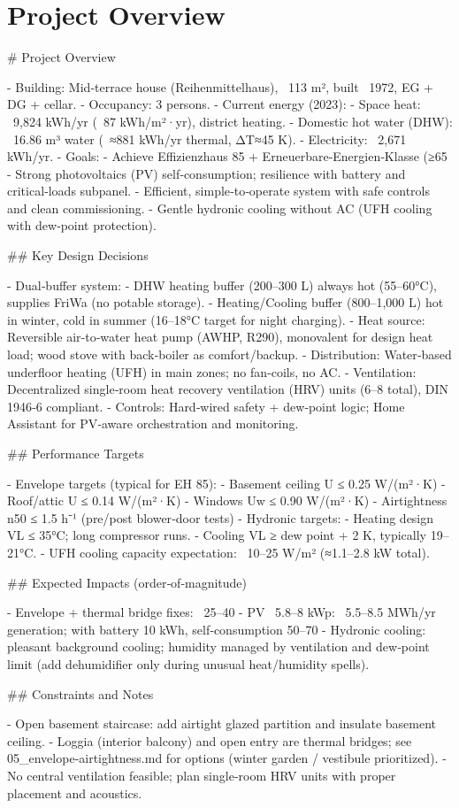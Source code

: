 \documentclass[11pt,oneside]{report}
\begin{document}
\chapter{Project Overview}
\begin{markdown}
# Project Overview

- Building: Mid‑terrace house (Reihenmittelhaus), ~113 m², built ~1972, EG + DG + cellar.
- Occupancy: 3 persons.
- Current energy (2023):
  - Space heat: ~9,824 kWh/yr (~87 kWh/m²·yr), district heating.
- Domestic hot water (DHW): ~16.86 m³ water (~≈881 kWh/yr thermal, ΔT≈45 K).
  - Electricity: ~2,671 kWh/yr.
- Goals:
  - Achieve Effizienzhaus 85 + Erneuerbare‑Energien‑Klasse (≥65%
- Strong photovoltaics (PV) self‑consumption; resilience with battery and critical‑loads subpanel.
  - Efficient, simple‑to‑operate system with safe controls and clean commissioning.
  - Gentle hydronic cooling without AC (UFH cooling with dew‑point protection).

## Key Design Decisions

- Dual‑buffer system:
  - DHW heating buffer (200–300 L) always hot (55–60°C), supplies FriWa (no potable storage).
  - Heating/Cooling buffer (800–1,000 L) hot in winter, cold in summer (16–18°C target for night charging).
- Heat source: Reversible air‑to‑water heat pump (AWHP, R290), monovalent for design heat load; wood stove with back‑boiler as comfort/backup.
- Distribution: Water‑based underfloor heating (UFH) in main zones; no fan‑coils, no AC.
- Ventilation: Decentralized single‑room heat recovery ventilation (HRV) units (6–8 total), DIN 1946‑6 compliant.
- Controls: Hard‑wired safety + dew‑point logic; Home Assistant for PV‑aware orchestration and monitoring.

## Performance Targets

- Envelope targets (typical for EH 85):
  - Basement ceiling U ≤ 0.25 W/(m²·K)
  - Roof/attic U ≤ 0.14 W/(m²·K)
  - Windows Uw ≤ 0.90 W/(m²·K)
  - Airtightness n50 ≤ 1.5 h⁻¹ (pre/post blower‑door tests)
- Hydronic targets:
  - Heating design VL ≤ 35°C; long compressor runs.
  - Cooling VL ≥ dew point + 2 K, typically 19–21°C.
  - UFH cooling capacity expectation: ~10–25 W/m² (≈1.1–2.8 kW total).

## Expected Impacts (order‑of‑magnitude)

- Envelope + thermal bridge fixes: ~25–40%
- PV ~5.8–8 kWp: ~5.5–8.5 MWh/yr generation; with battery 10 kWh, self‑consumption 50–70%
- Hydronic cooling: pleasant background cooling; humidity managed by ventilation and dew‑point limit (add dehumidifier only during unusual heat/humidity spells).

## Constraints and Notes

- Open basement staircase: add airtight glazed partition and insulate basement ceiling.
- Loggia (interior balcony) and open entry are thermal bridges; see 05_envelope‑airtightness.md for options (winter garden / vestibule prioritized).
- No central ventilation feasible; plan single‑room HRV units with proper placement and acoustics.
\end{markdown}
\end{document}
